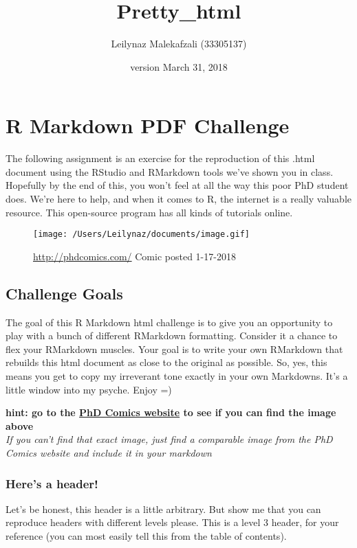 \documentclass[]{article}
\title{Pretty\_html}
\author{Leilynaz Malekafzali (33305137)}
\date{version March 31, 2018}
\begin{document}
\maketitle

{
\setcounter{tocdepth}{2}
\tableofcontents
}
\section{R Markdown PDF Challenge}\label{r-markdown-pdf-challenge}

The following assignment is an exercise for the reproduction of this
.html document using the RStudio and RMarkdown tools we've shown you in
class. Hopefully by the end of this, you won't feel at all the way this
poor PhD student does. We're here to help, and when it comes to R, the
internet is a really valuable resource. This open-source program has all
kinds of tutorials online.

\begin{figure}
\centering
\texttt{[image: /Users/Leilynaz/documents/image.gif]}
\caption{\url{http://phdcomics.com/} Comic posted 1-17-2018}
\end{figure}

\subsection{Challenge Goals}\label{challenge-goals}

The goal of this R Markdown html challenge is to give you an opportunity
to play with a bunch of different RMarkdown formatting. Consider it a
chance to flex your RMarkdown muscles. Your goal is to write your own
RMarkdown that rebuilds this html document as close to the original as
possible. So, yes, this means you get to copy my irreverant tone exactly
in your own Markdowns. It's a little window into my psyche. Enjoy =)

\textbf{hint: go to the \href{http://phdcomics.com/}{PhD Comics website}
to see if you can find the image above}\\
\emph{If you can't find that exact image, just find a comparable image
from the PhD Comics website and include it in your markdown}

\subsubsection{Here's a header!}\label{heres-a-header}

Let's be honest, this header is a little arbitrary. But show me that you
can reproduce headers with different levels please. This is a level 3
header, for your reference (you can most easily tell this from the table
of contents).
\end{document}
